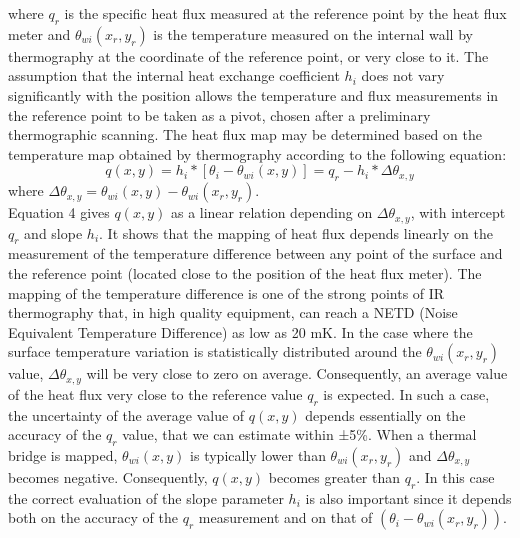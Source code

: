 where $ q_r $ is the specific heat flux measured at the reference point by the heat flux meter and $ \theta_{wi}(x_r,y_r) $ is the temperature measured on the internal wall by thermography at the coordinate of the reference point, or very close to it. The assumption that the internal heat exchange coefficient $ h_i $ does not vary significantly with the position allows the temperature and flux measurements in the reference point to be taken as a pivot, chosen after a preliminary thermographic scanning. The heat flux map may be determined based on the temperature map obtained by thermography according to the following equation:
\begin{equation}
q(x,y)=h_i*[\theta_i-\theta_{wi} (x,y)]=q_r-h_i*\Delta \theta_{x,y}
\end{equation}
where $\Delta \theta_{x,y}=\theta_{wi} (x,y)- \theta_{wi} (x_r,y_r) $.\\
Equation 4 gives $ q(x,y) $ as a linear relation depending on  $ \Delta \theta_{x,y} $, with intercept $ q_r $ and slope $ h_i $. It shows that the mapping of heat flux depends linearly on the measurement of the temperature difference between any point of the surface and the reference point (located close to the position of the heat flux meter). The mapping of the temperature difference is one of the strong points of IR thermography that, in high quality equipment, can reach a NETD (Noise Equivalent Temperature Difference) as low as 20 mK. 
In the case where the surface temperature variation is statistically distributed around the $\theta_{wi} (x_r,y_r)$ value, $\Delta \theta_{x,y}$ will be very close to zero on average. Consequently, an average value of the heat  flux very close to the reference value $q_r$ is expected. In such a case, the uncertainty of the average value of $q(x, y)$ depends essentially on the accuracy of the $q_r$ value, that we can estimate within ±5\%. When a thermal bridge is mapped, $\theta_{wi} (x,y)$ is typically lower than $\theta_{wi} (x_r,y_r)$ and $\Delta \theta_{x,y}$ becomes negative. Consequently, $q(x,y)$ becomes greater than $q_r$. In this case the correct evaluation of the slope parameter $h_i$ is also important since it depends both on the accuracy of the $q_r$ measurement and on that of $(\theta_i - \theta_{wi}(x_r,y_r))$.

